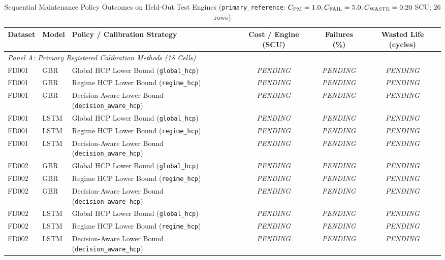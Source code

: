 \begin{table}[htbp]
\centering
\caption{Sequential Maintenance Policy Outcomes on Held-Out Test Engines (\texttt{primary\_reference}: $C_{\text{PM}}=1.0, C_{\text{FAIL}}=5.0, C_{\text{WASTE}}=0.20$ SCU; 26 rows)}
\label{tab:maintenance_outcomes}
\begin{tabular}{lllccc}
\toprule
\textbf{Dataset} & \textbf{Model} & \textbf{Policy / Calibration Strategy} & \textbf{Cost / Engine (SCU)} & \textbf{Failures (\%)} & \textbf{Wasted Life (cycles)} \\
\midrule
\multicolumn{6}{l}{\textit{Panel A: Primary Registered Calibration Methods (18 Cells)}} \\
\midrule
FD001 & GBR  & Global HCP Lower Bound (\texttt{global\_hcp})             & \textit{PENDING} & \textit{PENDING} & \textit{PENDING} \\
FD001 & GBR  & Regime HCP Lower Bound (\texttt{regime\_hcp})             & \textit{PENDING} & \textit{PENDING} & \textit{PENDING} \\
FD001 & GBR  & Decision-Aware Lower Bound (\texttt{decision\_aware\_hcp})& \textit{PENDING} & \textit{PENDING} & \textit{PENDING} \\
FD001 & LSTM & Global HCP Lower Bound (\texttt{global\_hcp})             & \textit{PENDING} & \textit{PENDING} & \textit{PENDING} \\
FD001 & LSTM & Regime HCP Lower Bound (\texttt{regime\_hcp})             & \textit{PENDING} & \textit{PENDING} & \textit{PENDING} \\
FD001 & LSTM & Decision-Aware Lower Bound (\texttt{decision\_aware\_hcp})& \textit{PENDING} & \textit{PENDING} & \textit{PENDING} \\
FD002 & GBR  & Global HCP Lower Bound (\texttt{global\_hcp})             & \textit{PENDING} & \textit{PENDING} & \textit{PENDING} \\
FD002 & GBR  & Regime HCP Lower Bound (\texttt{regime\_hcp})             & \textit{PENDING} & \textit{PENDING} & \textit{PENDING} \\
FD002 & GBR  & Decision-Aware Lower Bound (\texttt{decision\_aware\_hcp})& \textit{PENDING} & \textit{PENDING} & \textit{PENDING} \\
FD002 & LSTM & Global HCP Lower Bound (\texttt{global\_hcp})             & \textit{PENDING} & \textit{PENDING} & \textit{PENDING} \\
FD002 & LSTM & Regime HCP Lower Bound (\texttt{regime\_hcp})             & \textit{PENDING} & \textit{PENDING} & \textit{PENDING} \\
FD002 & LSTM & Decision-Aware Lower Bound (\texttt{decision\_aware\_hcp})& \textit{PENDING} & \textit{PENDING} & \textit{PENDING} \\

\end{tabular}
\end{table}
